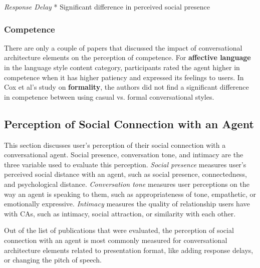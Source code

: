 \documentclass[sigconf,screen,review, anonymous]{acmart}
\newcommand{\cmt}[1]{}%
\begin{document}
\textit{Response Delay}
* Significant difference in perceived social presence \cite{gnewuch2018faster}\cmt{[19]}

\subsubsection{Competence}

There are only a couple of papers that discussed the impact of conversational architecture elements on the perception of competence. For \textbf{affective language} in the language style content category, participants rated the agent higher in competence when it has higher patiency and expressed its feelings to users. In Cox et al's study on \textbf{formality}, the authors did not find a significant difference in competence between using casual vs. formal conversational styles.



%


\subsection{Perception of Social Connection with an Agent}

This section discusses user's perception of their social connection with a conversational agent. Social presence, conversation tone, and intimacy are the three variable used to evaluate this perception. \textit{Social presence} measures user's perceived social distance with an agent, such as social presence, connectedness, and psychological distance. \textit{Conversation tone} measures user perceptions on the way an agent is speaking to them, such as appropriateness of tone, empathetic, or emotionally expressive. \textit{Intimacy} measures the quality of relationship users have with CAs, such as intimacy, social attraction, or similarity with each other.

Out of the list of publications that were evaluated, the perception of social connection with an agent is most commonly measured for conversational architecture elements related to presentation format, like adding response delays, or changing the pitch of speech.
\end{document}

